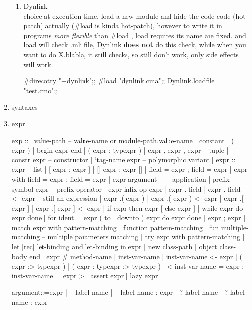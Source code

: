 \begin{enumerate}
\begin{enumerate}
    \item Dynlink \\
      choice at execution time, load a new module and hide the
      code code (hot-patch)
      actually (\#load is kinda hot-patch), however to write it in programs
      \emph{more flexible} than \#load , load requires its name are fixed, and
      load will check .mli file, Dynlink \textbf{does not} do this check, while when you
      want to do X.blabla, it still checks, so still don't work, only side
      effects will work.

\begin{ocamlcode}
#direcotry "+dynlink";;
#load "dynlink.cma";;
Dynlink.loadfile "test.cmo";;
\end{ocamlcode}

    \end{enumerate}

  \item syntaxes
  \item expr

\begin{ocamlcode}
exp	::=value-path  -- value-name or module-path.value-name
 	| constant  
 	| ( expr )  
 	| begin expr end  
 	| ( expr :  typexpr )  
 	| expr ,  expr  { , expr } -- tuple
 	| constr  expr  -- constructor
 	| `tag-name  expr  -- polymorphic variant
 	| expr ::  expr  -- list 
 	| [ expr  { ; expr } ]  
 	| [| expr  { ; expr } |]  
 	| { field =  expr  { ; field =  expr } }  
 	| { expr with  field =  expr  { ; field =  expr } }  
 	| expr  { argument }+ -- application  
 	| prefix-symbol  expr  -- prefix operator
 	| expr  infix-op  expr  
 	| expr .  field  
 	| expr .  field <-  expr  -- still an expression
 	| expr .(  expr )  
 	| expr .(  expr ) <-  expr  
 	| expr .[  expr ]  
 	| expr .[  expr ] <-  expr  
 	| if expr then  expr  [ else expr ]  
 	| while expr do  expr done  
 	| for ident =  expr  ( to |  downto ) expr do  expr done  
 	| expr ;  expr  
 	| match expr with  pattern-matching  
 	| function pattern-matching  
 	| fun multiple-matching  -- multiple parameters matching
 	| try expr with  pattern-matching  
 	| let [rec] let-binding   { and let-binding } in  expr  
 	| new class-path  
 	| object class-body end  
 	| expr #  method-name  
 	| inst-var-name  
 	| inst-var-name <-  expr  
 	| ( expr :>  typexpr )  
 	| ( expr :  typexpr :>  typexpr )  
 	| {< inst-var-name =  expr  { ; inst-var-name =  expr } >}  
 	| assert expr  
 	| lazy expr  
 
argument::=expr  
 	| ~ label-name  
 	| ~ label-name :  expr  
 	| ? label-name  
 	| ? label-name :  expr  
 

\end{ocamlcode}
\end{enumerate}

